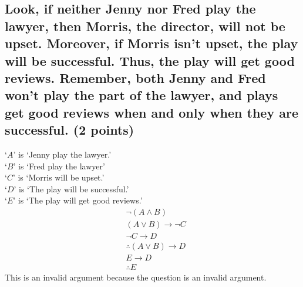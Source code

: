\documentclass[10pt, letterpaper, titlepage]{article}
\begin{document}
        \subsection{Look, if neither Jenny nor Fred play the lawyer, then Morris, the director, will not
            be upset. Moreover, if Morris isn’t upset, the play will be successful. Thus, the
            play will get good reviews. Remember, both Jenny and Fred won’t play the part
            of the lawyer, and plays get good reviews when and only when they are successful.
            (2 points)}
            `$A$' is `Jenny play the lawyer.'\\
            `$B$' is `Fred play the lawyer'\\
            `$C$' is `Morris will be upset.'\\
            `$D$' is `The play will be successful.'\\
            `$E$' is `The play will get good reviews.'
            \begin{align*}
                &\lnot (A \land B)\\
                &(A \lor B) \to \lnot C\\
                &\lnot C \to D\\
                &\therefore (A \lor B) \to D\\
                &E \to D\\
                &\therefore E
            \end{align*}
            This is an invalid argument because the question is an invalid argument.
\end{document}
